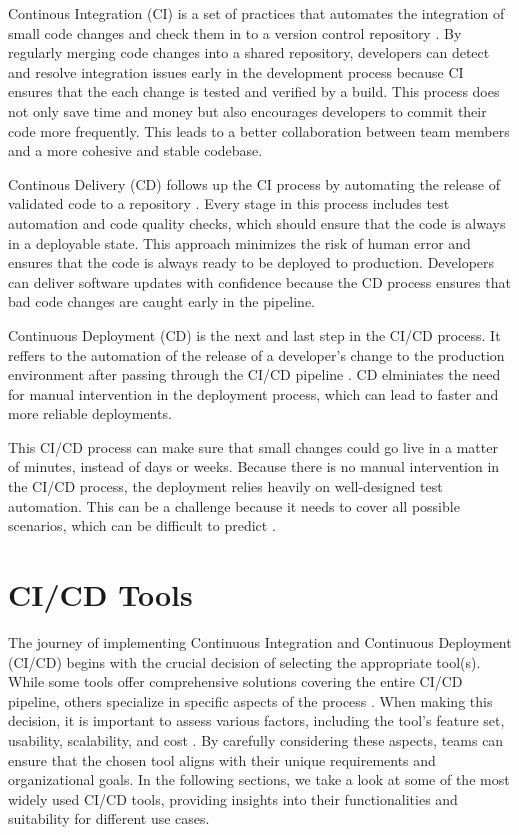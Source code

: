 Continous Integration (CI) is a set of practices that automates the integration of small code changes and check them in to a version control repository \autocite{Sacolick2024}.
By regularly merging code changes into a shared repository, developers can detect and resolve integration issues early in the development process because CI ensures that the each change is tested and verified by a build.
This process does not only save time and money but also encourages developers to commit their code more frequently.
This leads to a better collaboration between team members and a more cohesive and stable codebase.

Continous Delivery (CD) follows up the CI process by automating the release of validated code to a repository \autocite{Hat2023}.
Every stage in this process includes test automation and code quality checks, which should ensure that the code is always in a deployable state.
This approach minimizes the risk of human error and ensures that the code is always ready to be deployed to production. 
Developers can deliver software updates with confidence because the CD process ensures that bad code changes are caught early in the pipeline.

Continuous Deployment (CD) is the next and last step in the CI/CD process.
It reffers to the automation of the release of a developer's change to the production environment after passing through the CI/CD pipeline \autocite{Hat2023}.
CD elminiates the need for manual intervention in the deployment process, which can lead to faster and more reliable deployments.

This CI/CD process can make sure that small changes could go live in a matter of minutes, instead of days or weeks. 
Because there is no manual intervention in the CI/CD process, the deployment relies heavily on well-designed test automation.
This can be a challenge because it needs to cover all possible scenarios, which can be difficult to predict \autocite{Hat2023}.



\section{CI/CD Tools}
The journey of implementing Continuous Integration and Continuous Deployment (CI/CD) begins with the crucial decision of selecting the appropriate tool(s). 
While some tools offer comprehensive solutions covering the entire CI/CD pipeline, others specialize in specific aspects of the process \autocite{Hat2023}. 
When making this decision, it is important to assess various factors, including the tool's feature set, usability, scalability, and cost \autocite{Synopsys}. 
By carefully considering these aspects, teams can ensure that the chosen tool aligns with their unique requirements and organizational goals.
In the following sections, we take a look at some of the most widely used CI/CD tools, providing insights into their functionalities and suitability for different use cases.


